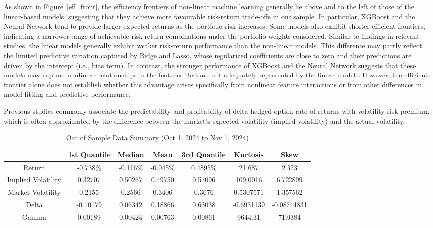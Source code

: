 \documentclass[oneside, 12pt]{article}
\newcommand*{\1}{\text{\scalebox{1.1}{\usefont{U}{bbold}{m}{n}1}}}
\begin{document}
As shown in Figure~\ref{eff_front}, the efficiency frontiers of non-linear machine learning generally lie above and to the left of those of the linear-based models, suggesting that they achieve more favourable risk-return trade-offs in our sample. In particular, XGBoost and the Neural Network tend to provide larger expected returns as the portfolio risk increases. Some models also exhibit shorter efficient frontiers, indicating a narrower range of achievable risk-return combinations under the portfolio weights considered. Similar to findings in relevant studies, the linear models generally exhibit weaker risk-return performance than the non-linear models. This difference may partly reflect the limited predictive variation captured by Ridge and Lasso, whose regularized coefficients are close to zero and their predictions are driven by the intercept (i.e., bias term). In contrast, the stronger performance of XGBoost and the Neural Network suggests that these models may capture nonlinear relationships in the features that are not adequately represented by the linear models. However, the efficient frontier alone does not establish whether this advantage arises specifically from nonlinear feature interactions or from other differences in model fitting and predictive performance.   \newline

Previous studies commonly associate the predictability and profitability of delta-hedged option rate of returns with volatility risk premium, which is often approximated by the difference between the market's expected volatility (implied volatility) and the actual volatility. 

\begin{table}[h!]
  \centering
  \begin{tabular}{ccccccc}
  \hline
  & 1st Quantile & Median & Mean & 3rd Quantile & Kurtosis & Skew \\
  \hline
\rule{0pt}{3ex} Return & -0.738\% & -0.116\% & -0.045\% & 0.4895\% & 21.687 & 2.523  \\
Implied Volatility & 0.32707 & 0.50267 & 0.49750 & 0.57096 & 109.0016 & 6.722899 \\
Market Volatility & 0.2155 & 0.2566 & 0.3406  & 0.3676 & 0.5307571 & 1.357562 \\
Delta & -0.10179 & 0.06342  & 0.18866  & 0.63038 & -0.6931139 & -0.08344831 \\
Gamma & 0.00189 & 0.00424 & 0.00763 & 0.00861 & 9644.31 & 71.0384 \\
 \hline
 \end{tabular}
  \caption{Out of Sample Data Summary (Oct 1, 2024 to Nov 1, 2024)}
  \label{sum_out}
\end{table}
\end{document}
